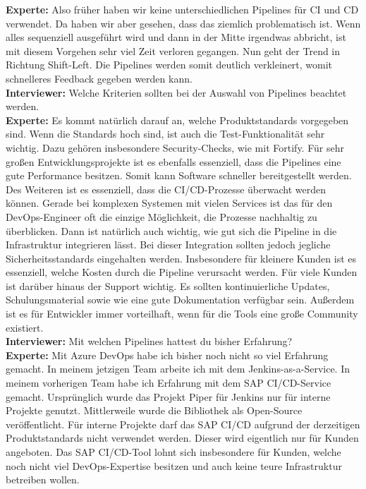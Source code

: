 \begin{linenumbers}
    \textbf{Experte:} Also früher haben wir keine unterschiedlichen Pipelines für CI und CD verwendet. Da haben wir aber gesehen, dass das ziemlich problematisch ist. Wenn alles sequenziell ausgeführt wird und dann in der Mitte irgendwas abbricht, ist mit diesem Vorgehen sehr viel Zeit verloren gegangen. Nun geht der Trend in Richtung Shift-Left. Die Pipelines werden somit deutlich verkleinert, womit schnelleres Feedback gegeben werden kann.\\
    \textbf{Interviewer:} Welche Kriterien sollten bei der Auswahl von Pipelines beachtet werden.\\
    \textbf{Experte:} Es kommt natürlich darauf an, welche Produktstandards vorgegeben sind. Wenn die Standards hoch sind, ist auch die Test-Funktionalität sehr wichtig. Dazu gehören insbesondere Security-Checks, wie mit Fortify. Für sehr großen Entwicklungsprojekte ist es ebenfalls essenziell, dass die Pipelines eine gute Performance besitzen. Somit kann Software schneller bereitgestellt werden. Des Weiteren ist es essenziell, dass die CI/CD-Prozesse überwacht werden können. Gerade bei komplexen Systemen mit vielen Services ist das für den DevOps-Engineer oft die einzige Möglichkeit, die Prozesse nachhaltig zu überblicken. Dann ist natürlich auch wichtig, wie gut sich die Pipeline in die Infrastruktur integrieren lässt. Bei dieser Integration sollten jedoch jegliche Sicherheitsstandards eingehalten werden. Insbesondere für kleinere Kunden ist es essenziell, welche Kosten durch die Pipeline verursacht werden. Für viele Kunden ist darüber hinaus der Support wichtig. Es sollten kontinuierliche Updates, Schulungsmaterial sowie wie eine gute Dokumentation verfügbar sein. Außerdem ist es für Entwickler immer vorteilhaft, wenn für die Tools eine große Community existiert.\\
    \textbf{Interviewer:} Mit welchen Pipelines hattest du bisher Erfahrung?\\
    \textbf{Experte:} Mit Azure DevOps habe ich bisher noch nicht so viel Erfahrung gemacht. In meinem jetzigen Team arbeite ich mit dem Jenkins-as-a-Service. In meinem vorherigen Team habe ich Erfahrung mit dem SAP CI/CD-Service gemacht. Ursprünglich wurde das Projekt Piper für Jenkins nur für interne Projekte genutzt. Mittlerweile wurde die Bibliothek als Open-Source veröffentlicht. Für interne Projekte darf das SAP CI/CD aufgrund der derzeitigen Produktstandards nicht verwendet werden. Dieser wird eigentlich nur für Kunden angeboten. Das SAP CI/CD-Tool lohnt sich insbesondere für Kunden, welche noch nicht viel DevOps-Expertise besitzen und auch keine teure Infrastruktur betreiben wollen.\\

\end{linenumbers}
